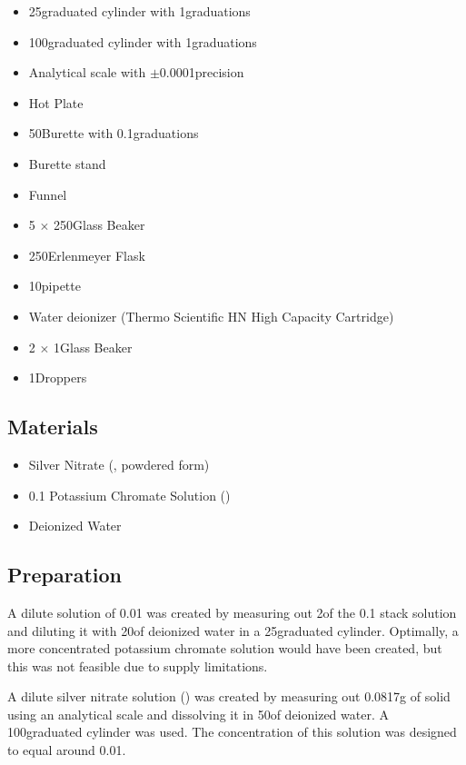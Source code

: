 \documentclass[11pt]{article}
\begin{document}
\begin{itemize}
	\item 25\ml graduated cylinder with 1\ml graduations
	\item 100\ml graduated cylinder with 1\ml graduations
	\item Analytical scale with $\pm$0.0001\gram precision

	\item Hot Plate
	\item 50\ml Burette with 0.1\ml graduations
	\item Burette stand
	\item Funnel

	\item 5 $\times$ 250\ml Glass Beaker
	\item 250\ml Erlenmeyer Flask
	\item 10\ml pipette

	\item Water deionizer (Thermo Scientific HN High Capacity Cartridge)

	\item 2 $\times$ 1\litre Glass Beaker
	\item 1\ml Droppers
\end{itemize}

\subsection{Materials}

\begin{itemize}
	\item Silver Nitrate (, powdered form)
	\item 0.1 \mpl Potassium Chromate Solution ()
	\item Deionized Water
\end{itemize}

\subsection{Preparation}

A dilute solution of 0.01\mpl {} was created by measuring out 2\ml of the 0.1\mpl {} stack solution and diluting it with 20\ml of deionized water in a 25\ml graduated cylinder. Optimally, a more concentrated potassium chromate solution would have been created, but this was not feasible due to supply limitations.

A dilute silver nitrate solution () was created by measuring out 0.0817g of solid  using an analytical scale and dissolving it in 50\ml of deionized water. A 100\ml graduated cylinder was used. The concentration of this solution was designed to equal around 0.01\mpl.
\end{document}
